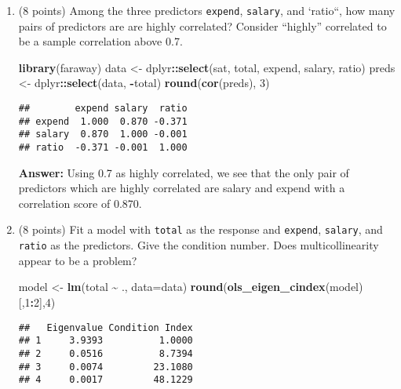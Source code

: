 \documentclass[
]{article}
\newenvironment{Shaded}{\begin{snugshade}}{\end{snugshade}}
\newcommand{\AttributeTok}[1]{\textcolor[rgb]{0.13,0.29,0.53}{#1}}
\newcommand{\DecValTok}[1]{\textcolor[rgb]{0.00,0.00,0.81}{#1}}
\newcommand{\FunctionTok}[1]{\textcolor[rgb]{0.13,0.29,0.53}{\textbf{#1}}}
\newcommand{\NormalTok}[1]{#1}
\newcommand{\OtherTok}[1]{\textcolor[rgb]{0.56,0.35,0.01}{#1}}
\newcommand{\SpecialCharTok}[1]{\textcolor[rgb]{0.81,0.36,0.00}{\textbf{#1}}}
\begin{document}
\begin{enumerate}
\def\labelenumi{\arabic{enumi}.}
\item
  (8 points) Among the three predictors \texttt{expend},
  \texttt{salary}, and `ratio``, how many pairs of predictors are are
  highly correlated? Consider ``highly'' correlated to be a sample
  correlation above 0.7.

\begin{Shaded}
\begin{Highlighting}[]
\FunctionTok{library}\NormalTok{(faraway)}
\NormalTok{data }\OtherTok{\textless{}{-}}\NormalTok{ dplyr}\SpecialCharTok{::}\FunctionTok{select}\NormalTok{(sat, total, expend, salary, ratio)}
\NormalTok{preds }\OtherTok{\textless{}{-}}\NormalTok{ dplyr}\SpecialCharTok{::}\FunctionTok{select}\NormalTok{(data, }\SpecialCharTok{{-}}\NormalTok{total)}
\FunctionTok{round}\NormalTok{(}\FunctionTok{cor}\NormalTok{(preds), }\DecValTok{3}\NormalTok{)}
\end{Highlighting}
\end{Shaded}

\begin{verbatim}
##        expend salary  ratio
## expend  1.000  0.870 -0.371
## salary  0.870  1.000 -0.001
## ratio  -0.371 -0.001  1.000
\end{verbatim}

  \textbf{Answer:} Using 0.7 as highly correlated, we see that the only
  pair of predictors which are highly correlated are salary and expend
  with a correlation score of 0.870.
\item
  (8 points) Fit a model with \texttt{total} as the response and
  \texttt{expend}, \texttt{salary}, and \texttt{ratio} as the
  predictors. Give the condition number. Does multicollinearity appear
  to be a problem?

\begin{Shaded}
\begin{Highlighting}[]
\NormalTok{model }\OtherTok{\textless{}{-}} \FunctionTok{lm}\NormalTok{(total }\SpecialCharTok{\textasciitilde{}}\NormalTok{ ., }\AttributeTok{data=}\NormalTok{data)}
\FunctionTok{round}\NormalTok{(}\FunctionTok{ols\_eigen\_cindex}\NormalTok{(model)[,}\DecValTok{1}\SpecialCharTok{:}\DecValTok{2}\NormalTok{],}\DecValTok{4}\NormalTok{)}
\end{Highlighting}
\end{Shaded}

\begin{verbatim}
##   Eigenvalue Condition Index
## 1     3.9393          1.0000
## 2     0.0516          8.7394
## 3     0.0074         23.1080
## 4     0.0017         48.1229
\end{verbatim}


\end{enumerate}
\end{document}
